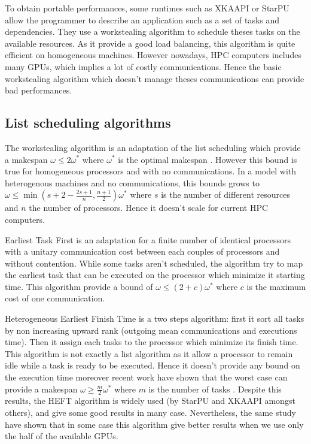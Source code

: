 \documentclass[10pt, conference, compsocconf,pdftex,dvipsnames]{IEEEtran}
\begin{document}
To obtain portable performances, some runtimes such as XKAAPI
\cite{gautierxkaapi} or StarPU \cite{augonnet2011starpu} allow the programmer
to describe an application such as a set of tasks and dependencies.  They use
a workstealing algorithm \cite{blumofe1995cilk} to schedule theses tasks on
the available resources. As it provide a good load balancing, this algorithm
is quite efficient on homogeneous machines. However nowadays, HPC computers
includes many GPUs, which implies a lot of costly communications. Hence the
basic workstealing algorithm which doesn't manage theses communications can
provide bad performances.

\subsection{List scheduling algorithms}

The workstealing algorithm is an adaptation of the list scheduling which
provide a makespan $\omega\leq2\omega^*$ where $\omega^*$ is the optimal
makespan \cite{GrahamRL1966Bounds, GrahamRL1969Bounds}. However this bound is
true for homogeneous processors and with no communications. In a model with
heterogenous machines and no communications, this bounds grows to
$\omega\leq\min(s+2-\frac{2s+1}{n},\frac{n+1}{2})\omega^*$ where $s$ is the
number of different resources and $n$ the number of processors. Hence it
doesn't scale for current HPC computers. 

Earliest Task First\cite{hwang1989scheduling} is an adaptation for a finite
number of identical processors with a unitary communication cost between each
couples of processors and without contention. While some tasks aren't
scheduled, the algorithm try to map the earliest task that can be executed on
the processor which minimize it starting time. This algorithm provide a bound
of $\omega\leq(2+c)\omega^*$ where $c$ is the maximum cost of one
communication.  

Heterogeneous Earliest Finish Time \cite{topcuoglu2002performance}  is a two
steps algorithm: first it sort all tasks by non increasing upward rank
(outgoing mean communications and executions time). Then it assign each tasks
to the processor which minimize its finish time. This algorithm is not exactly
a list algorithm as it allow a processor to remain idle while a task is ready
to be executed.  Hence it doesn't provide any bound on the execution time
moreover recent work have shown that the worst case can provide a makespan
$\omega \geq \frac{m}{2}\omega^*$ where $m$ is the number of tasks
\cite{Kedad-SidhoumMonnaMounieEtAl2013}. Despite this results, the HEFT
algorithm is widely used (by StarPU and XKAAPI amongst others), and give some
good results in many case\cite{ferreiralima:hal-00735470}. Nevertheless, the
same study have shown that in some case this algorithm give better results
when we use only the half of the available GPUs.
\end{document}
